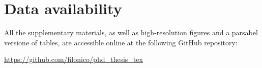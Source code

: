 
% 

{
\chapter*{Data availability}
\label{data_availability}
}

\normalsize
All the supplementary materials, as well as high-resolution figures and a parsabel versione of tables, are accessible online at the following GitHub repository:

\underline{\href{https://github.com/filonico/phd_thesis_tex}{https://github.com/filonico/phd\_thesis\_tex}}

% 